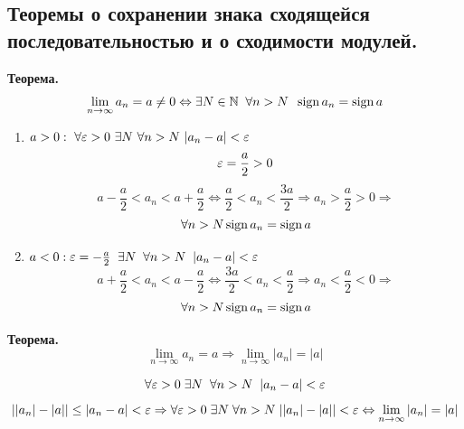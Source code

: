 \subsection{Теоремы о сохранении знака сходящейся последовательностью и о сходимости модулей.}

\begin{tcolorbox}
	\textbf{Теорема.}
	\[ \lim_{n\to\infty} a_n = a \not=0 \Leftrightarrow \exists N \in \mathbb{N}\;\; \forall n > N\;\; \operatorname{sign} a_n = \operatorname{sign} a \]
\end{tcolorbox}
\begin{tcolorbox}[title=Доказательство]
	\begin{enumerate}
		\item $a > 0:\ \forall \eps > 0\ \exists N\ \forall n > N\ |a_n - a|<\eps$
		\[ \varepsilon = \frac{a}{2} > 0 \]
		\[ a - \frac{a}{2} < a_n < a + \frac{a}{2} \Leftrightarrow \frac{a}{2} < a_n < \frac{3a}{2} \Rightarrow a_n > \frac{a}{2} > 0 \Rightarrow \]
		\[ \forall n > N \operatorname{sign} a_n = \operatorname{sign} a \]
	\item $a < 0: \varepsilon = -\frac{a}{2}\;\; \exists N \;\; \forall n > N\;\; |a_n - a| < \varepsilon$
		\[ a + \frac{a}{2} < a_n < a - \frac{a}{2} \Leftrightarrow \frac{3a}{2} < a_n < \frac{a}{2} \Rightarrow a_n < \frac{a}{2} < 0 \Rightarrow \]
		\[ \forall n > N \operatorname{sign} a_n = \operatorname{sign} a \]
	\end{enumerate}
\end{tcolorbox}

\begin{tcolorbox}
	\textbf{Теорема.}
	\[ \lim_{n\to\infty} a_n = a \Rightarrow \lim_{n\to\infty} |a_n| = |a| \]
\end{tcolorbox}

\begin{tcolorbox}[title=Доказательство]
	\[ \forall \varepsilon > 0\; \exists N\;\; \forall n > N\;\; | a_n - a| < \varepsilon \]
	\[ ||a_n| - |a|| \leq |a_n - a| < \varepsilon \Rightarrow \forall \varepsilon > 0\; \exists N \; \forall n > N\; ||a_n| - |a|| < \varepsilon \Leftrightarrow \lim_{n\to\infty} |a_n| = |a| \]
\end{tcolorbox}
